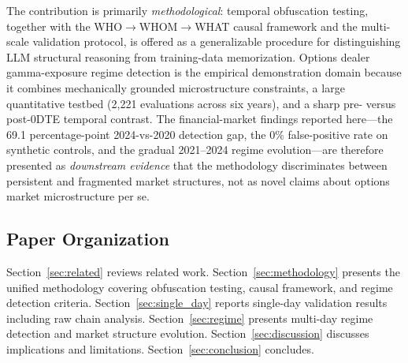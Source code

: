 The contribution is primarily \textit{methodological}: temporal obfuscation testing, together with the WHO$\rightarrow$WHOM$\rightarrow$WHAT causal framework and the multi-scale validation protocol, is offered as a generalizable procedure for distinguishing LLM structural reasoning from training-data memorization. Options dealer gamma-exposure regime detection is the empirical demonstration domain because it combines mechanically grounded microstructure constraints, a large quantitative testbed (2{,}221 evaluations across six years), and a sharp pre- versus post-0DTE temporal contrast. The financial-market findings reported here---the 69.1 percentage-point 2024-vs-2020 detection gap, the 0\% false-positive rate on synthetic controls, and the gradual 2021--2024 regime evolution---are therefore presented as \textit{downstream evidence} that the methodology discriminates between persistent and fragmented market structures, not as novel claims about options market microstructure per se.

\subsection{Paper Organization}

Section~\ref{sec:related} reviews related work. Section~\ref{sec:methodology} presents the unified methodology covering obfuscation testing, causal framework, and regime detection criteria. Section~\ref{sec:single_day} reports single-day validation results including raw chain analysis. Section~\ref{sec:regime} presents multi-day regime detection and market structure evolution. Section~\ref{sec:discussion} discusses implications and limitations. Section~\ref{sec:conclusion} concludes.
